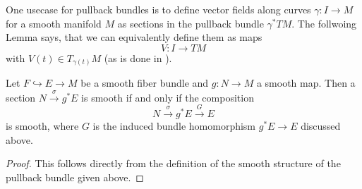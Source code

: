    \vspace{1em}

   One usecase for pullback bundles is to define vector fields along curves $\gamma \colon I \to M$ for a smooth manifold $M$ as sections in the pullback bundle $\gamma^\ast TM$. The follwoing Lemma says, that we can equivalently define them as maps 
   \[
   V \colon I \to TM
   \]
   with $V(t) \in T_{\gamma(t)} M$ (as is done in \cite{lee2018riemannian}).

   \begin{lemma}
    Let $F \hookrightarrow E \to M$ be a smooth fiber bundle and $g \colon N \to M$ a smooth map. Then a section $N \xrightarrow{\sigma} g^\ast E$ is smooth if and only if the composition
    \[
    N \xrightarrow{\sigma} g^\ast E \xrightarrow{G} E
    \]
    is smooth, where $G$ is the induced bundle homomorphism $g^\ast E \to E$ discussed above.
   \end{lemma}

   \begin{proof}
    This follows directly from the definition of the smooth structure of the pullback bundle given above.
   \end{proof}